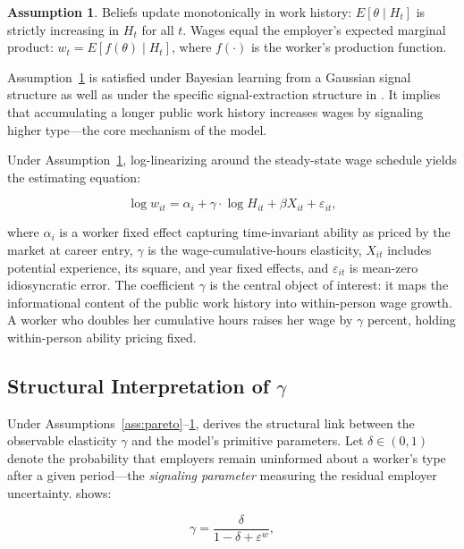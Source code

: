 \documentclass[12pt]{article}
\theoremstyle{definition}
\newtheorem{assumption}{Assumption}
\theoremstyle{remark}
\begin{document}
\begin{assumption}
\label{ass:learning}
Beliefs update monotonically in work history: $E[\theta \mid H_t]$ is strictly increasing in
$H_t$ for all $t$. Wages equal the employer's expected marginal product:
$w_t = E[f(\theta) \mid H_t]$, where $f(\cdot)$ is the worker's production function.
\end{assumption}

Assumption~\ref{ass:learning} is satisfied under Bayesian learning from a Gaussian signal
structure \citep{farber1996learning} as well as under the specific signal-extraction structure
in \citet{sztutman2024}. It implies that accumulating a longer public work history increases
wages by signaling higher type---the core mechanism of the model.

Under Assumption~\ref{ass:learning}, log-linearizing around the steady-state wage schedule
yields the estimating equation:

\begin{equation}
\label{eq:wage}
\log w_{it} = \alpha_i + \gamma \cdot \log H_{it} + \beta X_{it} + \varepsilon_{it},
\end{equation}

where $\alpha_i$ is a worker fixed effect capturing time-invariant ability as priced by the
market at career entry, $\gamma$ is the wage-cumulative-hours elasticity, $X_{it}$ includes
potential experience, its square, and year fixed effects, and $\varepsilon_{it}$ is mean-zero
idiosyncratic error. The coefficient $\gamma$ is the central object of interest: it maps the
informational content of the public work history into within-person wage growth. A worker who
doubles her cumulative hours raises her wage by $\gamma$ percent, holding within-person ability
pricing fixed.

\subsection{Structural Interpretation of $\gamma$}

Under Assumptions~\ref{ass:pareto}--\ref{ass:learning}, \citet{sztutman2024} derives the
structural link between the observable elasticity $\gamma$ and the model's primitive
parameters. Let $\delta \in (0,1)$ denote the probability that employers remain uninformed
about a worker's type after a given period---the \emph{signaling parameter} measuring the
residual employer uncertainty. \citet{sztutman2024} shows:

\begin{equation}
\label{eq:gamma_structural}
\gamma = \frac{\delta}{1 - \delta + \varepsilon^w},
\end{equation}
\end{document}

